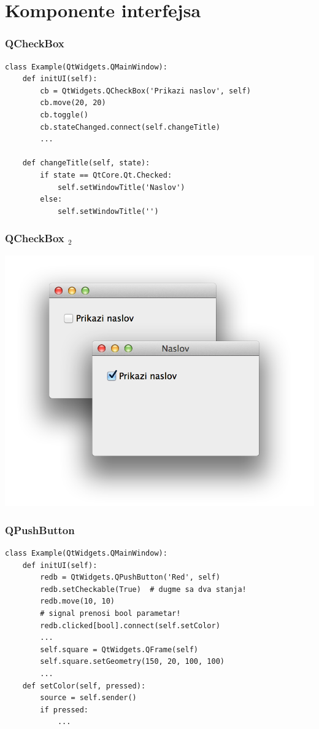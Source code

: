 \documentclass[utf8,compress,aspectratio=169]{beamer}
\begin{document}
\section[Widgets]{Komponente interfejsa}

\begin{frame}[fragile]
  \frametitle{QCheckBox}
\begin{verbatim}
class Example(QtWidgets.QMainWindow):
    def initUI(self):
        cb = QtWidgets.QCheckBox('Prikazi naslov', self)
        cb.move(20, 20)
        cb.toggle()
        cb.stateChanged.connect(self.changeTitle)
        ...

    def changeTitle(self, state):
        if state == QtCore.Qt.Checked:
            self.setWindowTitle('Naslov')
        else:
            self.setWindowTitle('')
\end{verbatim}
\end{frame}

\begin{frame}[fragile]
  \frametitle{QCheckBox $_2$}
\begin{center}
\includegraphics[scale=0.25]{pyqt12.png}
\end{center}
\end{frame}

\begin{frame}
  \frametitle{QPushButton}
\begin{verbatim}
class Example(QtWidgets.QMainWindow):
    def initUI(self):
        redb = QtWidgets.QPushButton('Red', self)
        redb.setCheckable(True)  # dugme sa dva stanja!
        redb.move(10, 10)
        # signal prenosi bool parametar!
        redb.clicked[bool].connect(self.setColor)
        ...
        self.square = QtWidgets.QFrame(self)
        self.square.setGeometry(150, 20, 100, 100)
        ...
    def setColor(self, pressed):
        source = self.sender()
        if pressed:
            ...
\end{verbatim}
\end{frame}
\end{document}
